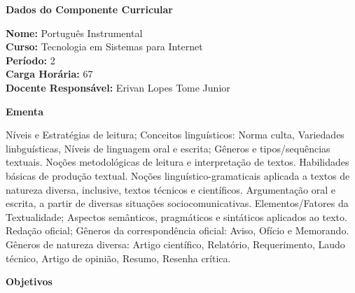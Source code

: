 

\begin{snugshade}\begin{center}\textbf{
    Dados do Componente Curricular
}\end{center}\end{snugshade}

\noindent \textbf{Nome:}                Portugu\^es Instrumental
\\        \textbf{Curso:}               Tecnologia em Sistemas para Internet
\\        \textbf{Período:}             \unit{2}{\degree}
\\        \textbf{Carga Horária:}       \unit{67}{\hour}
\\        \textbf{Docente Responsável:} Erivan Lopes Tome Junior


\begin{snugshade}\begin{center}\textbf{
    Ementa
\vphantom{q}}\end{center}\end{snugshade}

\noindent
Níveis e Estratégias de leitura; Conceitos linguísticos: Norma culta, Variedades linbguísticas, Níveis de linguagem oral e escrita; Gêneros e tipos/sequências textuais. Noções metodológicas de leitura e interpretação de textos. Habilidades básicas de produção textual. Noções linguístico-gramaticais aplicada a textos de natureza diversa, inclusive, textos técnicos e científicos. Argumentação oral e escrita, a partir de diversas situações sociocomunicativas. Elementos/Fatores da Textualidade; Aspectos semânticos, pragmáticos e sintáticos aplicados ao texto. Redação oficial; Gêneros da correspondência oficial: Aviso, Ofício e Memorando. Gêneros de natureza diversa: Artigo científico, Relatório, Requerimento, Laudo técnico, Artigo de opinião, Resumo, Resenha crítica.

\begin{snugshade}\begin{center}\textbf{
    Objetivos
}\end{center}\end{snugshade}

